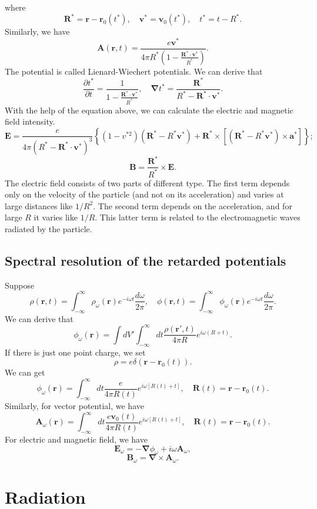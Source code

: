 where 
\[\bm{R}^* = \bm{r} - \bm{r}_0(t^*) , \quad \bm{v}^* = \bm{v}_0(t^*) , \quad t^* = t - R^*.\]
Similarly, we have
\[\bm{A}(\bm{r},t) = \frac{e\bm{v}^*}{4\pi R^* (1 - \frac{\bm{R}^* \cdot \bm{v}^*}{R^*})}.\]
The potential is called Lienard-Wiechert potentials.
We can derive that
\[\frac{\partial t^*}{\partial t} = \frac{1}{1- \frac{\bm{R}^* \cdot \bm{v}^*}{R^*}} , \quad \bm{\nabla} t^* = \frac{\bm{R}^*}{R^* - \bm{R}^* \cdot \bm{v}^*}.\]
With the help of the equation above, we can calculate the electric and magnetic field intensity.
\[\bm{E} = \frac{e}{4\pi(R^* - \bm{R}^* \cdot \bm{v}^*)^3} \left\{ (1-v^{*2})(\bm{R}^* - R^*\bm{v}^*) + \bm{R}^* \times \left[(\bm{R}^* - R^*\bm{v}^*) \times \bm{a}^* \right] \right\};\]
\[\bm{B} = \frac{\bm{R}^*}{R^*} \times \bm{E}.\]
The electric field consists of two parts of different type. The first term depends only on the velocity of the particle (and not on its acceleration) and varies at large distances like ${1}/{R^2}$. The second term depends on the acceleration, and for large $R$ it varies like ${1}/{R}$. This latter term is related to the electromagnetic waves radiated by the particle.

\subsection{Spectral resolution of the retarded potentials}
Suppose
\[\rho(\bm{r},t) = \int_{-\infty}^{\infty} \rho_{\omega}(\bm{r}) e^{-i\omega t} \frac{d\omega}{2\pi} , \quad \phi(\bm{r},t) = \int_{-\infty}^{\infty} \phi_{\omega}(\bm{r}) e^{-i\omega t} \frac{d\omega}{2\pi}.\]
We can derive that
\[\phi_{\omega}(\bm{r}) = \int dV' \int_{-\infty}^{\infty} dt \frac{\rho(\bm{r}',t)}{4\pi R} e^{i\omega(
R+t)}.\]
If there is just one point charge, we set
\[\rho = e\delta(\bm{r} - \bm{r}_0(t)).\]
We can get
\[\phi_{\omega}(\bm{r}) =  \int_{-\infty}^{\infty} dt \frac{e}{4\pi R(t)} e^{i\omega[
R(t)+t]} , \quad \bm{R}(t) =\bm{r}-\bm{r}_0(t).\]
Similarly, for vector potential, we have
\[\bm{A}_{\omega}(\bm{r}) =  \int_{-\infty}^{\infty} dt \frac{e\bm{v}_0(t)}{4\pi R(t)} e^{i\omega[
R(t)+t]} , \quad \bm{R}(t) =\bm{r}-\bm{r}_0(t).\]
For electric and magnetic field, we have
\[\bm{E}_{\omega} = -\bm{\nabla}\phi_{\omega} + i\omega \bm{A}_{\omega},\]
\[\bm{B}_{\omega} = \bm{\nabla} \times \bm{A}_{\omega}.\]

\section{Radiation}
